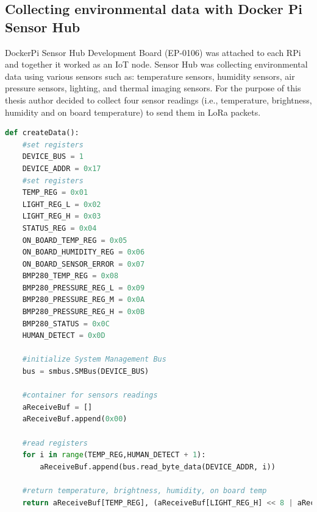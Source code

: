 \documentclass[oneside,12pt]{book}
\begin{document}
\subsection{Collecting environmental data with Docker Pi Sensor Hub}
DockerPi Sensor Hub Development Board (EP-0106) was attached to each RPi and together it worked as an IoT node. Sensor Hub was collecting environmental data using various sensors such as: temperature sensors, humidity sensors, air pressure sensors, lighting, and thermal imaging sensors. For the purpose of this thesis author decided to collect four sensor readings (i.e.,  temperature, brightness, humidity and on board temperature) to send them in LoRa packets.
\begin{lstlisting}[language=Python, caption=Sensor data collection - Python3,captionpos=b]
def createData():
    #set registers
    DEVICE_BUS = 1
    DEVICE_ADDR = 0x17
    #set registers
    TEMP_REG = 0x01
    LIGHT_REG_L = 0x02
    LIGHT_REG_H = 0x03
    STATUS_REG = 0x04
    ON_BOARD_TEMP_REG = 0x05
    ON_BOARD_HUMIDITY_REG = 0x06
    ON_BOARD_SENSOR_ERROR = 0x07
    BMP280_TEMP_REG = 0x08
    BMP280_PRESSURE_REG_L = 0x09
    BMP280_PRESSURE_REG_M = 0x0A
    BMP280_PRESSURE_REG_H = 0x0B
    BMP280_STATUS = 0x0C
    HUMAN_DETECT = 0x0D
    
    #initialize System Management Bus
    bus = smbus.SMBus(DEVICE_BUS)

    #container for sensors readings
    aReceiveBuf = []
    aReceiveBuf.append(0x00)
    
    #read registers
    for i in range(TEMP_REG,HUMAN_DETECT + 1):
        aReceiveBuf.append(bus.read_byte_data(DEVICE_ADDR, i))
    
    #return temperature, brightness, humidity, on board temp
    return aReceiveBuf[TEMP_REG], (aReceiveBuf[LIGHT_REG_H] << 8 | aReceiveBuf[LIGHT_REG_L]), aReceiveBuf[ON_BOARD_HUMIDITY_REG], aReceiveBuf[ON_BOARD_TEMP_REG]
\end{lstlisting}
\end{document}
